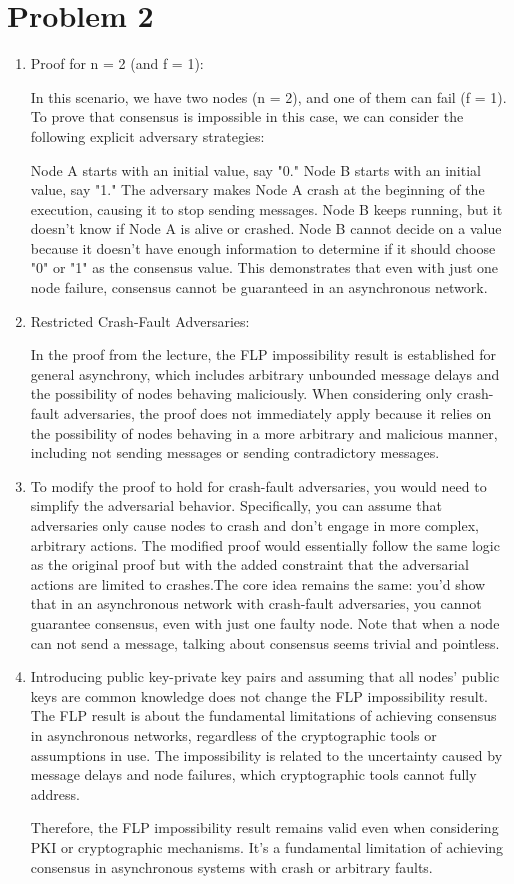 \documentclass{article}
\begin{document}
\section*{Problem 2}


\begin{enumerate}
\item %
     Proof for n = 2 (and f = 1):
     
In this scenario, we have two nodes (n = 2), and one of them can fail (f = 1). To prove that consensus is impossible in this case, we can consider the following explicit adversary strategies:

Node A starts with an initial value, say "0."
Node B starts with an initial value, say "1."
The adversary makes Node A crash at the beginning of the execution, causing it to stop sending messages.
Node B keeps running, but it doesn't know if Node A is alive or crashed.
Node B cannot decide on a value because it doesn't have enough information to determine if it should choose "0" or "1" as the consensus value.
This demonstrates that even with just one node failure, consensus cannot be guaranteed in an asynchronous network.
\item %
 Restricted Crash-Fault Adversaries:
 
In the proof from the lecture, the FLP impossibility result is established for general asynchrony, which includes arbitrary unbounded message delays and the possibility of nodes behaving maliciously. When considering only crash-fault adversaries, the proof does not immediately apply because it relies on the possibility of nodes behaving in a more arbitrary and malicious manner, including not sending messages or sending contradictory messages.

\item %
    To modify the proof to hold for crash-fault adversaries, you would need to simplify the adversarial behavior. Specifically, you can assume that adversaries only cause nodes to crash and don't engage in more complex, arbitrary actions. The modified proof would essentially follow the same logic as the original proof but with the added constraint that the adversarial actions are limited to crashes.The core idea remains the same: you'd show that in an asynchronous network with crash-fault adversaries, you cannot guarantee consensus, even with just one faulty node. Note that when a node can not send a message, talking about consensus seems trivial and pointless.
\item %
    Introducing public key-private key pairs and assuming that all nodes' public keys are common knowledge does not change the FLP impossibility result. The FLP result is about the fundamental limitations of achieving consensus in asynchronous networks, regardless of the cryptographic tools or assumptions in use. The impossibility is related to the uncertainty caused by message delays and node failures, which cryptographic tools cannot fully address.

Therefore, the FLP impossibility result remains valid even when considering PKI or cryptographic mechanisms. It's a fundamental limitation of achieving consensus in asynchronous systems with crash or arbitrary faults.
\end{enumerate}
\end{document}
